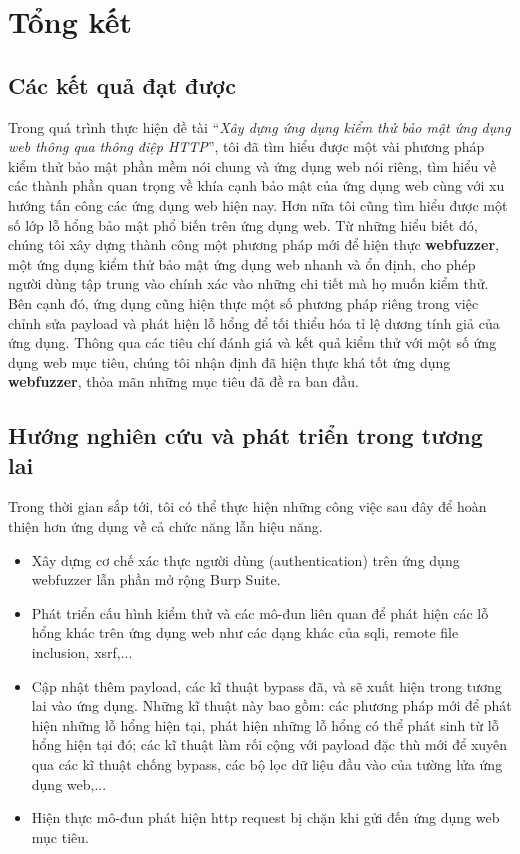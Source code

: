 \chapter{Tổng kết}
\section{Các kết quả đạt được}
Trong quá trình thực hiện đề tài ``\textit{Xây dựng ứng dụng kiểm thử bảo mật ứng dụng web thông qua thông điệp HTTP}'', tôi đã tìm hiểu được một vài phương pháp kiểm thử bảo mật phần mềm nói chung và ứng dụng web nói riêng, tìm hiểu về các thành phần quan trọng về khía cạnh bảo mật của ứng dụng web cùng với xu hướng tấn công các ứng dụng web hiện nay. Hơn nữa tôi cũng tìm hiểu được một số lớp lỗ hổng bảo mật phổ biến trên ứng dụng web. Từ những hiểu biết đó, chúng tôi xây dựng thành công một phương pháp mới để hiện thực \textbf{webfuzzer}, một ứng dụng kiểm thử bảo mật ứng dụng web nhanh và ổn định, cho phép người dùng tập trung vào chính xác vào những chi tiết mà họ muốn kiểm thử. Bên cạnh đó, ứng dụng cũng hiện thực một số phương pháp riêng trong việc chỉnh sửa payload và phát hiện lỗ hổng để tối thiểu hóa tỉ lệ dương tính giả của ứng dụng. Thông qua các tiêu chí đánh giá và kết quả kiểm thử với một số ứng dụng web mục tiêu, chúng tôi nhận định đã hiện thực khá tốt ứng dụng \textbf{webfuzzer}, thỏa mãn những mục tiêu đã đề ra ban đầu.

\section{Hướng nghiên cứu và phát triển trong tương lai}
Trong thời gian sắp tới, tôi có thể thực hiện những công việc sau đây để hoàn thiện hơn ứng dụng về cả chức năng lẫn hiệu năng.
\begin{itemize}
    \item Xây dựng cơ chế xác thực người dùng (authentication) trên ứng dụng webfuzzer lẫn phần mở rộng Burp Suite.
    \item Phát triển cấu hình kiểm thử và các mô-đun liên quan để phát hiện các lỗ hổng khác trên ứng dụng web như các dạng khác của \acrshort{sqli}, remote file inclusion, \acrshort{xsrf},...
    \item Cập nhật thêm payload, các kĩ thuật bypass đã, và sẽ xuất hiện trong tương lai vào ứng dụng. Những kĩ thuật này bao gồm: các phương pháp mới để phát hiện những lỗ hổng hiện tại, phát hiện những lỗ hổng có thể phát sinh từ lỗ hổng hiện tại đó; các kĩ thuật làm rối cộng với payload đặc thù mới để xuyên qua các kĩ thuật chống bypass, các bộ lọc dữ liệu đầu vào của tường lửa ứng dụng web,...
    \item Hiện thực mô-đun phát hiện \acrshort{http} request bị chặn khi gửi đến ứng dụng web mục tiêu.
\end{itemize}
